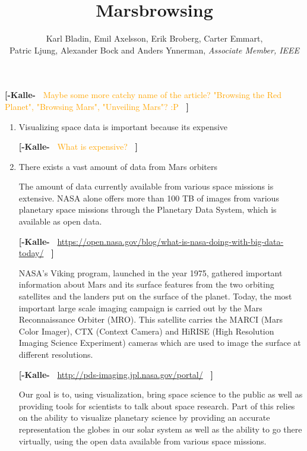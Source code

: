 \documentclass[journal]{vgtc}                %
\title{Marsbrowsing}
\author{Karl Bladin, Emil Axelsson, Erik Broberg, Carter Emmart, \\ Patric Ljung, Alexander Bock and Anders Ynnerman, \textit{Associate Member, IEEE}}
\newcommand{\kallecomment}[1]{\textbf{[-Kalle-~}
    \textcolor{orange}{#1}
    \textbf{~]}}
\begin{document}

 \label{sec:introduction}
\maketitle
\kallecomment{Maybe some more catchy name of the article? "Browsing the Red Planet", "Browsing Mars", "Unveiling Mars"? :P}

\begin{enumerate}
\item Visualizing space data is important because its expensive

\kallecomment{What is expensive?}

\item There exists a vast amount of data from Mars orbiters

The amount of data currently available from various space missions is extensive. NASA alone offers more than 100 TB of images from various planetary space missions through the Planetary Data System, which is available as open data.

\kallecomment{\url{https://open.nasa.gov/blog/what-is-nasa-doing-with-big-data-today/}}

NASA's Viking program, launched in the year 1975, gathered important information about Mars and its surface features from the two orbiting satellites and the landers put on the surface of the planet. Today, the most important large scale imaging campaign is carried out by the Mars Reconnaissance Orbiter (MRO). This satellite carries the MARCI (Mars Color Imager), CTX (Context Camera) and HiRISE (High Resolution Imaging Science Experiment) cameras which are used to image the surface at different resolutions.

\kallecomment{\url{http://pds-imaging.jpl.nasa.gov/portal/}}

Our goal is to, using visualization, bring space science to the public as well as providing tools for scientists to talk about space research. Part of this relies on the ability to visualize planetary science by providing an accurate representation the globes in our solar system as well as the ability to go there virtually, using the open data available from various space missions.


\end{enumerate}
\end{document}

